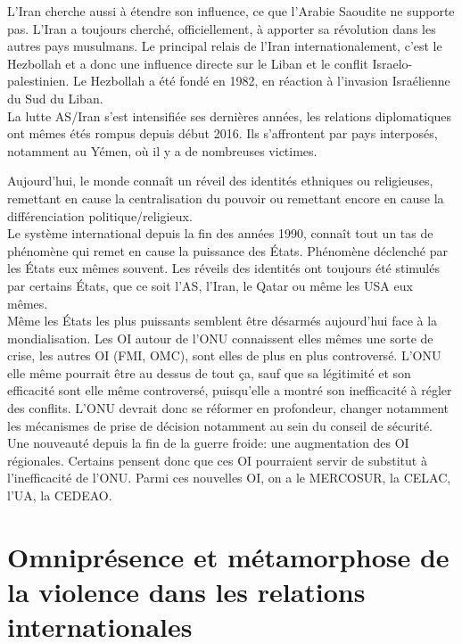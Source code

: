 \documentclass[10pt, a4paper, openany]{book}
\begin{document}
L'Iran cherche aussi à étendre son influence, ce que l'Arabie Saoudite ne supporte pas. L'Iran a toujours cherché, officiellement, à apporter sa révolution dans les autres pays musulmans. Le principal relais de l'Iran internationalement, c'est le Hezbollah et a donc une influence directe sur le Liban et le conflit Israelo-palestinien. Le Hezbollah a été fondé en 1982, en réaction à l'invasion Israélienne du Sud du Liban. \\
La lutte AS/Iran s'est intensifiée ses dernières années, les relations diplomatiques ont mêmes étés rompus depuis début 2016. Ils s'affrontent par pays interposés, notamment au Yémen, où il y a de nombreuses victimes.


Aujourd'hui, le monde connaît un réveil des identités ethniques ou religieuses, remettant en cause la centralisation du pouvoir ou remettant encore en cause la différenciation politique/religieux. \\
Le système international depuis la fin des années 1990, connaît tout un tas de phénomène qui remet en cause la puissance des États. Phénomène déclenché par les États eux mêmes souvent. Les réveils des identités ont toujours été stimulés par certains États, que ce soit l'AS, l'Iran, le Qatar ou même les USA eux mêmes. \\
Même les États les plus puissants semblent être désarmés aujourd'hui face à la mondialisation. Les OI autour de l'ONU connaissent elles mêmes une sorte de crise, les autres OI (FMI, OMC), sont elles de plus en plus controversé. L'ONU elle même pourrait être au dessus de tout ça, sauf que sa légitimité et son efficacité sont elle même controversé, puisqu'elle a montré son inefficacité à régler des conflits. L'ONU devrait donc se réformer en profondeur, changer notamment les mécanismes de prise de décision notamment au sein du conseil de sécurité. \\
Une nouveauté depuis la fin de la guerre froide: une augmentation des OI régionales. Certains pensent donc que ces OI pourraient servir de substitut à l'inefficacité de l'ONU. Parmi ces nouvelles OI, on a le MERCOSUR, la CELAC, l'UA, la CEDEAO. 

\chapter{Omniprésence et métamorphose de la violence dans les relations internationales}
\end{document}
